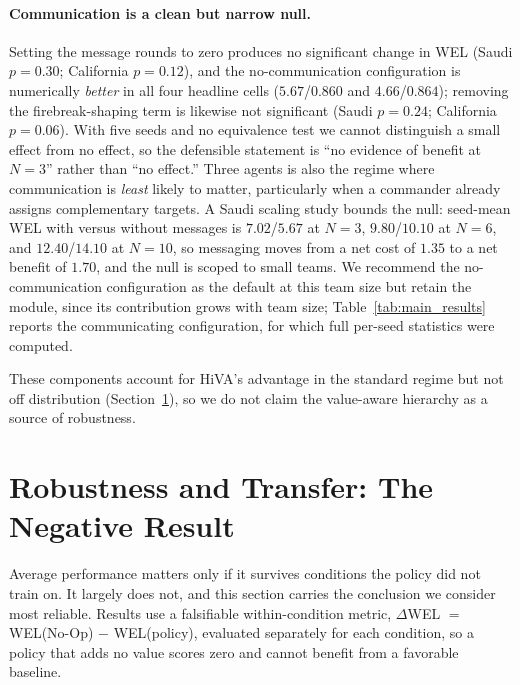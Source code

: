 \documentclass[letterpaper]{article}
\begin{document}
\paragraph{Communication is a clean but narrow null.} Setting the message rounds to zero produces no significant change in WEL (Saudi $p=0.30$; California $p=0.12$), and the no-communication configuration is numerically \emph{better} in all four headline cells ($5.67$/$0.860$ and $4.66$/$0.864$); removing the firebreak-shaping term is likewise not significant (Saudi $p=0.24$; California $p=0.06$). With five seeds and no equivalence test we cannot distinguish a small effect from no effect, so the defensible statement is ``no evidence of benefit at $N=3$'' rather than ``no effect.'' Three agents is also the regime where communication is \emph{least} likely to matter, particularly when a commander already assigns complementary targets. A Saudi scaling study bounds the null: seed-mean WEL with versus without messages is $7.02$/$5.67$ at $N{=}3$, $9.80$/$10.10$ at $N{=}6$, and $12.40$/$14.10$ at $N{=}10$, so messaging moves from a net cost of $1.35$ to a net benefit of $1.70$, and the null is scoped to small teams. We recommend the no-communication configuration as the default at this team size but retain the module, since its contribution grows with team size; Table~\ref{tab:main_results} reports the communicating configuration, for which full per-seed statistics were computed.

These components account for HiVA's advantage in the standard regime but not off distribution (Section~\ref{sec:transfer}), so we do not claim the value-aware hierarchy as a source of robustness.

\section{Robustness and Transfer: The Negative Result}
\label{sec:transfer}

Average performance matters only if it survives conditions the policy did not train on. It largely does not, and this section carries the conclusion we consider most reliable. Results use a falsifiable within-condition metric, $\Delta$WEL $=$ WEL(No-Op) $-$ WEL(policy), evaluated separately for each condition, so a policy that adds no value scores zero and cannot benefit from a favorable baseline.
\end{document}
